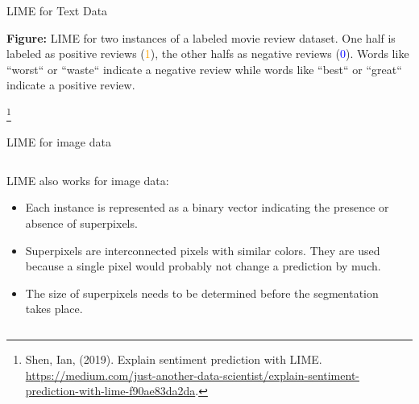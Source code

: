\documentclass[11pt,compress,t,notes=noshow, aspectratio=169, xcolor=table]{beamer}
\begin{document}
\begin{vbframe}{LIME for Text Data}
	
	\scriptsize{\textbf{Figure:} LIME for two instances of a labeled movie review dataset. One half is labeled as positive reviews (\textcolor{orange}{1}), 
		the other halfs as negative reviews (\textcolor{blue}{0}). Words like ``worst`` or ``waste`` indicate a negative review while words like ``best`` or ``great`` indicate a positive review.}
	
	\footnote[frame]{Shen, Ian, (2019). Explain sentiment prediction with LIME.
		\url{https://medium.com/just-another-data-scientist/explain-sentiment-prediction-with-lime-f90ae83da2da}.}
	
	
	\end{vbframe}
	
	\begin{vbframe}{LIME for image data}
	\begin{columns}
		\begin{column}{0.67\textwidth}
			LIME also works for image data:  
			\begin{itemize}
				\item Each instance is represented as a binary vector indicating the presence or absence of superpixels. 
				\item Superpixels are interconnected pixels with similar colors. They are used because a single pixel would probably not change a prediction by much.
				\item The size of superpixels needs to be determined before the segmentation takes place.
			\end{itemize}		
		\end{column}
		\begin{column}{0.26\textwidth}  
			\begin{center}

\end{center}
\end{column}
\end{columns}
\end{vbframe}
\end{document}
